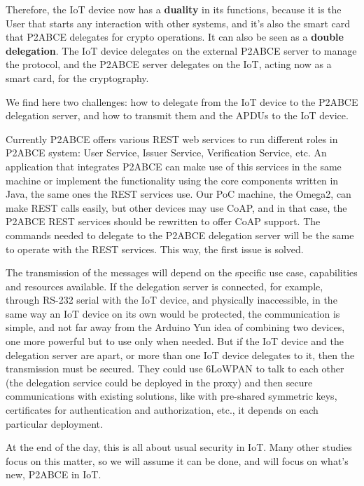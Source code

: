 \hfil


Therefore, the IoT device now has a \textbf{duality} in its functions, because it is the User that starts any interaction with other systems, and it's also the smart card that P2ABCE delegates for crypto operations. It can also be seen as a \textbf{double delegation}. The IoT device delegates on the external P2ABCE server to manage the protocol, and the P2ABCE server delegates on the IoT, acting now as a smart card, for the cryptography.




\hfil

We find here two challenges: how to delegate from the IoT device to the P2ABCE delegation server, and how to transmit them and the APDUs to the IoT device.

Currently P2ABCE offers various REST web services to run different roles in P2ABCE system: User Service, Issuer Service, Verification Service, etc. An application that integrates P2ABCE can make use of this services in the same machine or implement the functionality using the core components written in Java, the same ones the REST services use. Our PoC machine, the Omega2, can make REST calls easily, but other devices may use \ac{CoAP}, and in that case, the P2ABCE REST services should be rewritten to offer CoAP support. The commands needed to delegate to the P2ABCE delegation server will be the same to operate with the REST services. This way, the first issue is solved.

The transmission of the messages will depend on the specific use case, capabilities and resources available. If the delegation server is connected, for example, through RS-232 serial with the IoT device, and physically inaccessible, in the same way an IoT device on its own would be protected, the communication is simple, and not far away from the Arduino Yun idea of combining two devices, one more powerful but to use only when needed. But if the IoT device and the delegation server are apart, or more than one IoT device delegates to it, then the transmission must be secured. They could use 6LoWPAN to talk to each other (the delegation service could be deployed in the proxy) and then secure communications with existing solutions, like with pre-shared symmetric keys, certificates for authentication and authorization, etc., it depends on each particular deployment.

At the end of the day, this is all about usual security in IoT. Many other studies focus on this matter, so we will assume it can be done, and will focus on what's new, P2ABCE in IoT.


